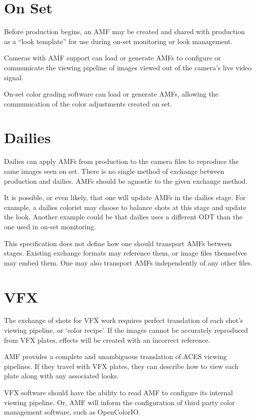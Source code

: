 \section{On Set}
Before production begins, an AMF may be created and shared with production as a ``look template'' for use during on-set monitoring or look management.

Cameras with AMF support can load or generate AMFs to configure or communicate the viewing pipeline of images viewed out of the camera's live video signal.

On-set color grading software can load or generate AMFs, allowing the communication of the color adjustments created on set.

\section{Dailies}
Dailies can apply AMFs from production to the camera files to reproduce the same images seen on set. There is no single method of exchange between production and dailies. AMFs should be agnostic to the given exchange method.

It is possible, or even likely, that one will update AMFs in the dailies stage. For example, a dailies colorist may choose to balance shots at this stage and update the look. Another example could be that dailies uses a different ODT than the one used in on-set monitoring.

This specification does not define how one should transport AMFs between stages. Existing exchange formats may reference them, or image files themselves may embed them. One may also transport AMFs independently of any other files.

\section{VFX}
The exchange of shots for VFX work requires perfect translation of each shot’s viewing pipeline, or ‘color recipe’. If the images cannot be accurately reproduced from VFX plates, effects will be created with an incorrect reference.

AMF provides a complete and unambiguous translation of ACES viewing pipelines. If they travel with VFX plates, they can describe how to view each plate along with any associated looks.

VFX software should have the ability to read AMF to configure its internal viewing pipeline. Or, AMF will inform the configuration of third party color management software, such as OpenColorIO.


